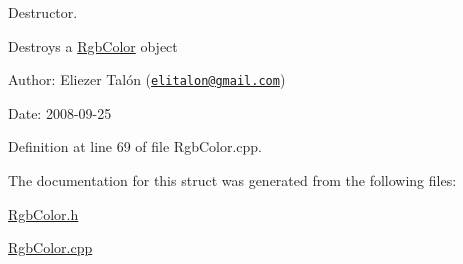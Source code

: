 Destructor. 

Destroys a \hyperlink{struct_rgb_color}{RgbColor} object

\begin{Desc}
\item[Author:]Eliezer Talón (\href{mailto:elitalon@gmail.com}{\tt elitalon@gmail.com}) \end{Desc}
\begin{Desc}
\item[Date:]2008-09-25 \end{Desc}


Definition at line 69 of file RgbColor.cpp.

The documentation for this struct was generated from the following files:\begin{CompactItemize}
\item 
\hyperlink{_rgb_color_8h}{RgbColor.h}\item 
\hyperlink{_rgb_color_8cpp}{RgbColor.cpp}\end{CompactItemize}
